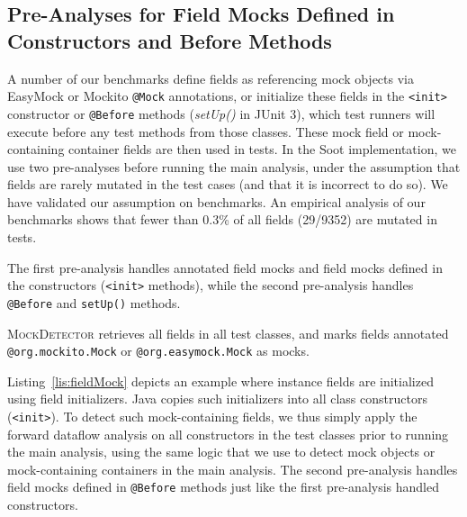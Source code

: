 \subsection{Pre-Analyses for Field Mocks Defined in Constructors and Before Methods}
\label{subsec:pre-analysis}

A number of our benchmarks define fields as referencing mock objects via EasyMock or Mockito \texttt{@Mock} annotations, or initialize these fields in the \texttt{<init>} constructor or \texttt{@Before} methods (\textit{setUp()} in JUnit 3), which test runners will execute before any test methods from those classes. These mock field or mock-containing container fields are then used in tests. In the Soot implementation, we use two pre-analyses before running the main analysis, under the assumption that fields are rarely mutated in the test cases (and that it is incorrect to do so). We have validated our assumption on benchmarks. An empirical analysis of our benchmarks shows that fewer than 0.3\% of all fields (29/9352) are mutated in tests.

The first pre-analysis handles annotated field mocks and field mocks defined in the constructors (\texttt{<init>} methods), while the second pre-analysis handles \texttt{@Before} and \texttt{setUp()} methods. 

\textsc{MockDetector} retrieves all fields in all test classes, and marks fields annotated {\tt @org.mockito.Mock} or {\tt @org.easymock.Mock} as mocks.

Listing~\ref{lis:fieldMock} depicts an example where instance fields are initialized using field initializers. Java copies such initializers into all class constructors (\texttt{<init>}). To detect such mock-containing fields, we thus simply apply the forward dataflow analysis on all constructors in the test classes prior to running the main analysis, using the same logic that we use to detect mock objects or mock-containing containers in the main analysis. The second pre-analysis handles field mocks defined in \texttt{@Before} methods just like the first pre-analysis handled constructors.



